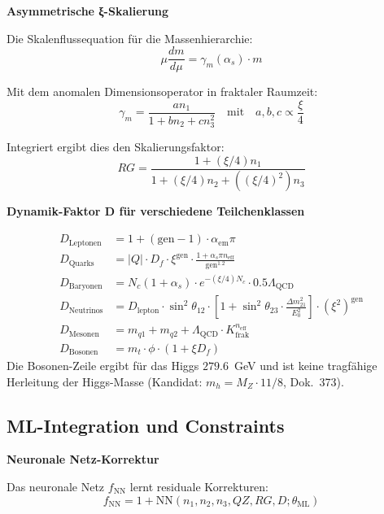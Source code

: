 	\textbf{Asymmetrische ξ-Skalierung}
	
	Die Skalenflussequation für die Massenhierarchie:
	\begin{equation}
		\mu \frac{dm}{d\mu} = \gamma_m(\alpha_s) \cdot m
	\end{equation}
	
	Mit dem anomalen Dimensionsoperator in fraktaler Raumzeit:
	\begin{equation}
		\gamma_m = \frac{a n_1}{1 + b n_2 + c n_3^2} \quad \text{mit} \quad a,b,c \propto \frac{\xi}{4}
	\end{equation}
	
	Integriert ergibt dies den Skalierungsfaktor:
	\begin{equation}
		RG = \frac{1 + (\xi/4) n_1}{1 + (\xi/4) n_2 + ((\xi/4)^2) n_3}
	\end{equation}
	
	\textbf{Dynamik-Faktor D für verschiedene Teilchenklassen}
	
	\begin{align}
		D_{\text{Leptonen}} &= 1 + (\text{gen} - 1) \cdot \alpha_{\text{em}} \pi \\
		D_{\text{Quarks}} &= |Q| \cdot D_f \cdot \xi^{\text{gen}} \cdot \frac{1 + \alpha_s \pi n_{\text{eff}}}{\text{gen}^{1.2}} \\
		D_{\text{Baryonen}} &= N_c (1 + \alpha_s) \cdot e^{-(\xi/4) N_c} \cdot 0.5 \Lambda_{\text{QCD}} \\
		D_{\text{Neutrinos}} &= D_{\text{lepton}} \cdot \sin^2 \theta_{12} \cdot \left[1 + \sin^2 \theta_{23} \cdot \frac{\Delta m^2_{21}}{E_0^2}\right] \cdot (\xi^2)^{\text{gen}} \\
		D_{\text{Mesonen}} &= m_{q1} + m_{q2} + \Lambda_{\text{QCD}} \cdot K_{\text{frak}}^{n_{\text{eff}}} \\
		D_{\text{Bosonen}} &= m_t \cdot \phi \cdot (1 + \xi D_f)
	\end{align}
	Die Bosonen-Zeile ergibt für das Higgs $279.6$~GeV und ist keine tragfähige Herleitung der Higgs-Masse (Kandidat: $m_h = M_Z \cdot 11/8$, Dok.~373).
	
	\subsection{ML-Integration und Constraints}
	
	\textbf{Neuronale Netz-Korrektur}
	
	Das neuronale Netz $f_{\text{NN}}$ lernt residuale Korrekturen:
	\begin{equation}
		f_{\text{NN}} = 1 + \text{NN}(n_1, n_2, n_3, QZ, RG, D; \theta_{\text{ML}})
	\end{equation}
	
